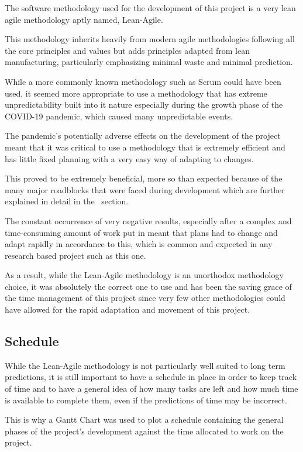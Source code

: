 \documentclass[12pt]{article}
\newcommand{\sentence}{} %
\begin{document}
    \tab
    The software methodology used for the development of this project is a very lean agile methodology aptly named,
    Lean-Agile.
    \sentence
    This methodology inherits heavily from modern agile methodologies following all the core principles and values
    but adds principles adapted from lean manufacturing, particularly emphasizing minimal waste and minimal
    prediction.
    \sentence
    While a more commonly known methodology such as Scrum could have been used, it seemed more appropriate to use a
    methodology that has extreme unpredictability built into it nature especially during the growth phase of the
    COVID-19 pandemic, which caused many unpredictable events.
    \sentence
    The pandemic's potentially adverse effects on the development of the project meant that it was critical to use a
    methodology that is extremely efficient and has little fixed planning with a very easy way of adapting to changes.
    \sentence
    This proved to be extremely beneficial, more so than expected because of the many major roadblocks that were
    faced during development which are further explained in detail in the~ section.
    \sentence
    The constant occurrence of very negative results, especially after a complex and time-consuming amount of work
    put in meant that plans had to change and adapt rapidly in accordance to this, which is common and expected in
    any research based project such as this one.
    \sentence
    As a result, while the Lean-Agile methodology is an unorthodox methodology choice, it was absolutely the correct
    one to use and has been the saving grace of the time management of this project since very few other
    methodologies could have allowed for the rapid adaptation and movement of this project.

    \subsection{Schedule}\label{subsec:schedule}


    \tab
    While the Lean-Agile methodology is not particularly well suited to long term predictions, it is still important
    to have a schedule in place in order to keep track of time and to have a general idea of how many tasks are left
    and how much time is available to complete them, even if the predictions of time may be incorrect.
    \sentence
    This is why a Gantt Chart was used to plot a schedule containing the general phases of the project's development
    against the time allocated to work on the project.
    \sentence
    \sentence
\end{document}
